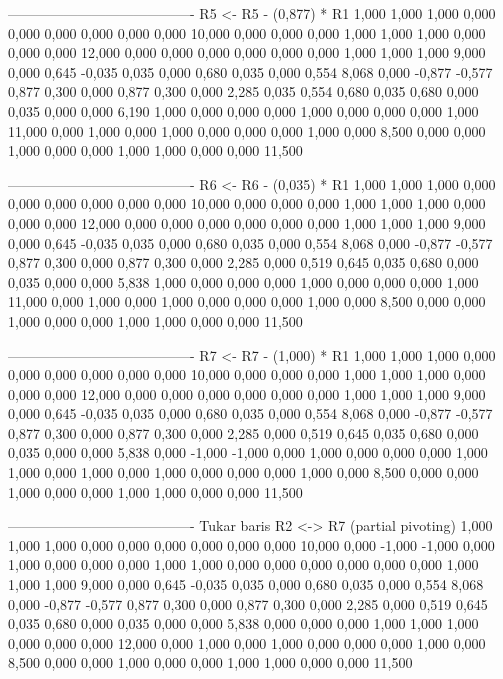 \documentclass[12pt]{article}
\begin{document}
\begin{enumerate}
\begin{keluaran}
----------------------------------------
R5 <- R5 - (0,877) * R1
1,000   1,000   1,000   0,000   0,000   0,000   0,000   0,000   0,000   10,000
0,000   0,000   0,000   1,000   1,000   1,000   0,000   0,000   0,000   12,000
0,000   0,000   0,000   0,000   0,000   0,000   1,000   1,000   1,000   9,000
0,000   0,645   -0,035  0,035   0,000   0,680   0,035   0,000   0,554   8,068
0,000   -0,877  -0,577  0,877   0,300   0,000   0,877   0,300   0,000   2,285
0,035   0,554   0,680   0,035   0,680   0,000   0,035   0,000   0,000   6,190
1,000   0,000   0,000   0,000   1,000   0,000   0,000   0,000   1,000   11,000
0,000   1,000   0,000   1,000   0,000   0,000   0,000   1,000   0,000   8,500
0,000   0,000   1,000   0,000   0,000   1,000   1,000   0,000   0,000   11,500

----------------------------------------
R6 <- R6 - (0,035) * R1
1,000   1,000   1,000   0,000   0,000   0,000   0,000   0,000   0,000   10,000
0,000   0,000   0,000   1,000   1,000   1,000   0,000   0,000   0,000   12,000
0,000   0,000   0,000   0,000   0,000   0,000   1,000   1,000   1,000   9,000
0,000   0,645   -0,035  0,035   0,000   0,680   0,035   0,000   0,554   8,068
0,000   -0,877  -0,577  0,877   0,300   0,000   0,877   0,300   0,000   2,285
0,000   0,519   0,645   0,035   0,680   0,000   0,035   0,000   0,000   5,838
1,000   0,000   0,000   0,000   1,000   0,000   0,000   0,000   1,000   11,000
0,000   1,000   0,000   1,000   0,000   0,000   0,000   1,000   0,000   8,500
0,000   0,000   1,000   0,000   0,000   1,000   1,000   0,000   0,000   11,500

----------------------------------------
R7 <- R7 - (1,000) * R1
1,000   1,000   1,000   0,000   0,000   0,000   0,000   0,000   0,000   10,000
0,000   0,000   0,000   1,000   1,000   1,000   0,000   0,000   0,000   12,000
0,000   0,000   0,000   0,000   0,000   0,000   1,000   1,000   1,000   9,000
0,000   0,645   -0,035  0,035   0,000   0,680   0,035   0,000   0,554   8,068
0,000   -0,877  -0,577  0,877   0,300   0,000   0,877   0,300   0,000   2,285
0,000   0,519   0,645   0,035   0,680   0,000   0,035   0,000   0,000   5,838
0,000   -1,000  -1,000  0,000   1,000   0,000   0,000   0,000   1,000   1,000
0,000   1,000   0,000   1,000   0,000   0,000   0,000   1,000   0,000   8,500
0,000   0,000   1,000   0,000   0,000   1,000   1,000   0,000   0,000   11,500

----------------------------------------
Tukar baris R2 <-> R7 (partial pivoting)
1,000   1,000   1,000   0,000   0,000   0,000   0,000   0,000   0,000   10,000
0,000   -1,000  -1,000  0,000   1,000   0,000   0,000   0,000   1,000   1,000
0,000   0,000   0,000   0,000   0,000   0,000   1,000   1,000   1,000   9,000
0,000   0,645   -0,035  0,035   0,000   0,680   0,035   0,000   0,554   8,068
0,000   -0,877  -0,577  0,877   0,300   0,000   0,877   0,300   0,000   2,285
0,000   0,519   0,645   0,035   0,680   0,000   0,035   0,000   0,000   5,838
0,000   0,000   0,000   1,000   1,000   1,000   0,000   0,000   0,000   12,000
0,000   1,000   0,000   1,000   0,000   0,000   0,000   1,000   0,000   8,500
0,000   0,000   1,000   0,000   0,000   1,000   1,000   0,000   0,000   11,500


\end{keluaran}
\end{enumerate}
\end{document}
